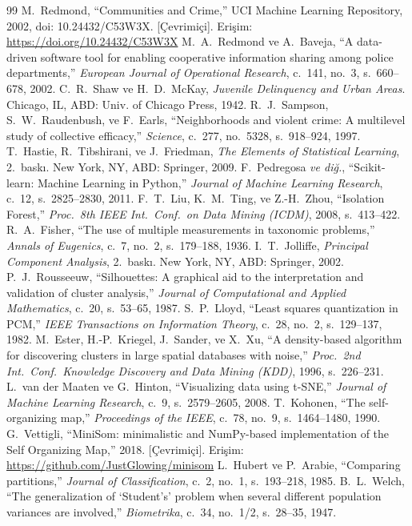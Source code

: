 \documentclass{ieeeaccess}
\begin{document}
\begin{thebibliography}{99}
M.~Redmond, ``Communities and Crime,'' UCI Machine Learning Repository, 2002, doi: 10.24432/C53W3X. [Çevrimiçi]. Erişim: \url{https://doi.org/10.24432/C53W3X}
M.~A.~Redmond ve A.~Baveja, ``A data-driven software tool for enabling cooperative information sharing among police departments,'' \emph{European Journal of Operational Research}, c.~141, no.~3, s.~660--678, 2002.
C.~R.~Shaw ve H.~D.~McKay, \emph{Juvenile Delinquency and Urban Areas}. Chicago, IL, ABD: Univ. of Chicago Press, 1942.
R.~J.~Sampson, S.~W.~Raudenbush, ve F.~Earls, ``Neighborhoods and violent crime: A multilevel study of collective efficacy,'' \emph{Science}, c.~277, no.~5328, s.~918--924, 1997.
T.~Hastie, R.~Tibshirani, ve J.~Friedman, \emph{The Elements of Statistical Learning}, 2.~baskı. New York, NY, ABD: Springer, 2009.
F.~Pedregosa \emph{ve diğ.}, ``Scikit-learn: Machine Learning in Python,'' \emph{Journal of Machine Learning Research}, c.~12, s.~2825--2830, 2011.
F.~T.~Liu, K.~M.~Ting, ve Z.-H.~Zhou, ``Isolation Forest,'' \emph{Proc.\ 8th IEEE Int.\ Conf.\ on Data Mining (ICDM)}, 2008, s.~413--422.
R.~A.~Fisher, ``The use of multiple measurements in taxonomic problems,'' \emph{Annals of Eugenics}, c.~7, no.~2, s.~179--188, 1936.
I.~T.~Jolliffe, \emph{Principal Component Analysis}, 2.~baskı. New York, NY, ABD: Springer, 2002.
P.~J.~Rousseeuw, ``Silhouettes: A graphical aid to the interpretation and validation of cluster analysis,'' \emph{Journal of Computational and Applied Mathematics}, c.~20, s.~53--65, 1987.
S.~P.~Lloyd, ``Least squares quantization in PCM,'' \emph{IEEE Transactions on Information Theory}, c.~28, no.~2, s.~129--137, 1982.
M.~Ester, H.-P.~Kriegel, J.~Sander, ve X.~Xu, ``A density-based algorithm for discovering clusters in large spatial databases with noise,'' \emph{Proc.\ 2nd Int.\ Conf.\ Knowledge Discovery and Data Mining (KDD)}, 1996, s.~226--231.
L.~van der Maaten ve G.~Hinton, ``Visualizing data using t-SNE,'' \emph{Journal of Machine Learning Research}, c.~9, s.~2579--2605, 2008.
T.~Kohonen, ``The self-organizing map,'' \emph{Proceedings of the IEEE}, c.~78, no.~9, s.~1464--1480, 1990.
G.~Vettigli, ``MiniSom: minimalistic and NumPy-based implementation of the Self Organizing Map,'' 2018. [Çevrimiçi]. Erişim: \url{https://github.com/JustGlowing/minisom}
L.~Hubert ve P.~Arabie, ``Comparing partitions,'' \emph{Journal of Classification}, c.~2, no.~1, s.~193--218, 1985.
B.~L.~Welch, ``The generalization of `Student's' problem when several different population variances are involved,'' \emph{Biometrika}, c.~34, no.~1/2, s.~28--35, 1947.
\end{thebibliography}
\end{document}
